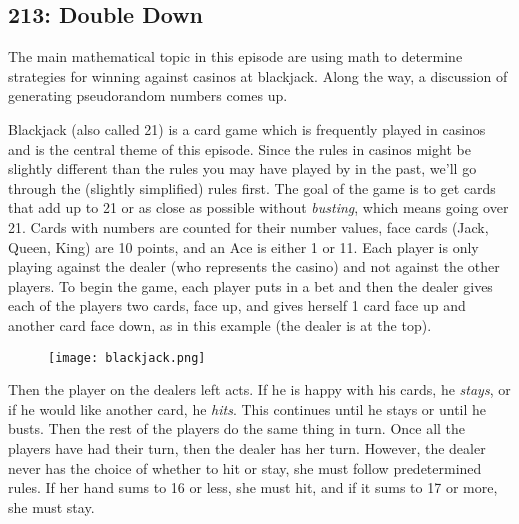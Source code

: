 \newpage
\subsection{213: Double Down}\label{213}

The main mathematical topic in this episode are using math to determine strategies for winning against casinos at blackjack. Along the way, a discussion of generating pseudorandom numbers comes up. \\


Blackjack (also called 21) is a card game which is frequently played in casinos and is the central theme of this episode. Since the rules in casinos might be slightly different than the rules you may have played by in the past, we'll go through the (slightly simplified) rules first. The goal of the game is to get cards that add up to 21 or as close as possible without \emph{busting}, which means going over 21. Cards with numbers are counted for their number values, face cards (Jack, Queen, King) are 10 points, and an Ace is either 1 or 11. Each player is only playing against the dealer (who represents the casino) and not against the other players. To begin the game, each player puts in a bet and then the dealer gives each of the players two cards, face up, and gives herself 1 card face up and another card face down, as in this example (the dealer is at the top). 

\begin{figure}[H]
   \centering
   \texttt{[image: blackjack.png]} 
\end{figure}

Then the player on the dealers left acts. If he is happy with his cards, he \emph{stays}, or if he would like another card, he \emph{hits}. This continues until he stays or until he busts. Then the rest of the players do the same thing in turn. Once all the players have had their turn, then the dealer has her turn. However, the dealer never has the choice of whether to hit or stay, she must follow predetermined rules. If her hand sums to 16 or less, she must hit, and if it sums to 17 or more, she must stay. \\


